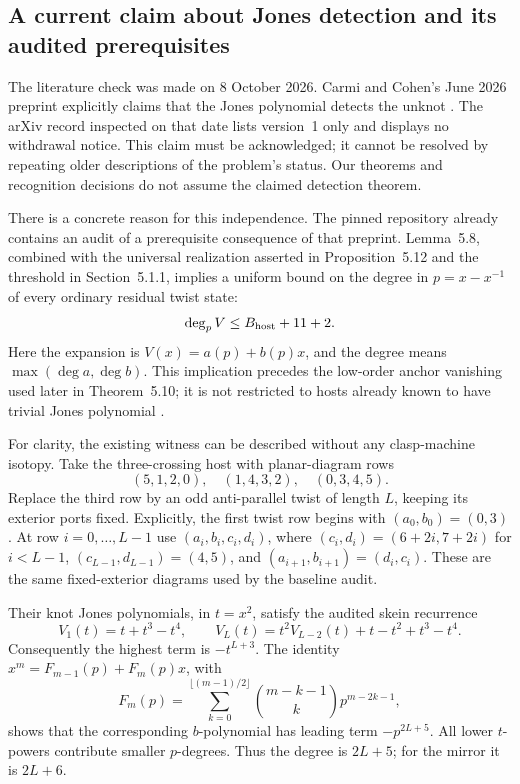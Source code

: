 \subsection{A current claim about Jones detection and its audited prerequisites}
\label{sec:jones-status}

The literature check was made on 8 October 2026. Carmi and Cohen's
June 2026 preprint explicitly claims that the Jones polynomial detects the
unknot \cite[Theorem~6.9]{carmicohen2026}. The arXiv record inspected on that
date lists version~1 only and displays no withdrawal notice. This claim
must be acknowledged; it cannot be resolved by repeating older descriptions
of the problem's status. Our theorems and recognition decisions do not assume
the claimed detection theorem.

There is a concrete reason for this independence. The pinned repository
already contains an audit of a prerequisite consequence of that preprint.
Lemma~5.8, combined with the universal realization asserted in
Proposition~5.12 and the threshold in Section~5.1.1, implies a uniform bound
on the degree in $p=x-x^{-1}$ of every ordinary residual twist state:
\[
 \deg_p V\le B_{\rm host}+11+2.
\]
Here the expansion is $V(x)=a(p)+b(p)x$, and the degree means
$\max(\deg a,\deg b)$. This implication precedes the low-order anchor
vanishing used later in Theorem~5.10; it is not restricted to hosts already
known to have trivial Jones polynomial \cite[Sections~5.1--5.6]{carmicohen2026}.

For clarity, the existing witness can be described without any clasp-machine
isotopy. Take the three-crossing host with planar-diagram rows
\[
 (5,1,2,0),\quad(1,4,3,2),\quad(0,3,4,5).
\]
Replace the third row by an odd anti-parallel twist of length $L$, keeping
its exterior ports fixed. Explicitly, the first twist row begins with
$(a_0,b_0)=(0,3)$. At row $i=0,\ldots,L-1$ use
$(a_i,b_i,c_i,d_i)$, where $(c_i,d_i)=(6+2i,7+2i)$ for $i<L-1$,
$(c_{L-1},d_{L-1})=(4,5)$, and
$(a_{i+1},b_{i+1})=(d_i,c_i)$. These are the same fixed-exterior
diagrams used by the baseline audit.

Their knot Jones polynomials, in $t=x^2$, satisfy the audited skein recurrence
\[
 V_1(t)=t+t^3-t^4,\qquad
 V_L(t)=t^2V_{L-2}(t)+t-t^2+t^3-t^4.
\]
Consequently the highest term is $-t^{L+3}$. The identity
$x^m=F_{m-1}(p)+F_m(p)x$, with
\[
 F_m(p)=\sum_{k=0}^{\lfloor(m-1)/2\rfloor}
          \binom{m-k-1}{k}p^{m-2k-1},
\]
shows that the corresponding $b$-polynomial has leading term
$-p^{2L+5}$. All lower $t$-powers contribute smaller $p$-degrees.
Thus the degree is $2L+5$; for the mirror it is $2L+6$.

